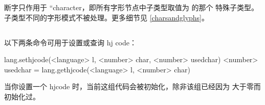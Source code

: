断字只作用于 ``character，即所有字形节点中子类型取值为  的那个
特殊子类型。子类型不同的字形模式不被处理。更多细节见
\ref{charsandglyphs}。

\subsection {}


以下两条命令可用于设置或查询 hj code：

\begin{typing}
lang.sethjcode(<language> l, <number> char, <number> usedchar)
<number> usedchar = lang.gethjcode(<language> l, <number> char)
\end{typing}

当你设置一个 hjcode 时，当前这组代码会被初始化，除非该组已经因为
 大于零而初始化过。

